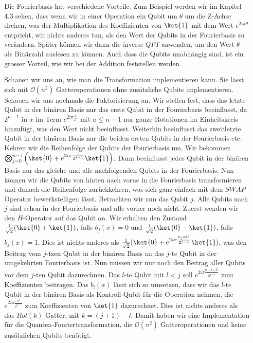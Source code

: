 
Die Fourierbasis hat verschiedene Vorteile. Zum Beispiel werden wir im Kapitel 4.3 sehen, dass wenn wir in einer Operation ein Qubit um $\theta$ um die Z-Achse drehen, was der Multiplikation des Koeffizienten von $\ket{1}$ mit dem Wert $e^{2i\pi\theta}$ entpricht, wir nichts anderes tun, als den Wert der Qubits in der Fourierbasis zu verändern. Später können wir dann die inverse $QFT$ anwenden, um den Wert $\theta$ als Binärzahl auslesen zu können. Auch dass die Qubits unabhängig sind, ist ein grosser Vorteil, wie wir bei der Addition feststellen werden.

Schauen wir uns an, wie man die Transformation implementieren kann. Sie lässt sich mit $\mathcal O(n^2)$ Gatteroperationen ohne zusätzliche Qubits implementieren. Schauen wir uns nochmals die Faktorisierung an. Wir stellen fest, dass das letzte Qubit in der binären Basis nur das erste Qubit in der Fourierbasis beeinflusst, da $2^{n - 1}$ in $x$ im Term $e^{2i\pi\frac{x}{2^a}}$ mit $a \leq n - 1$ nur ganze Rotationen im Einheitskreis hinzufügt, was den Wert nicht beeinflusst. Weiterhin beeinflusst das zweitletzte Qubit in der binären Basis nur die beiden ersten Qubits in der Fourierbasis etc. Kehren wir die Reihenfolge der Qubits der Fourierbasis um. Wir bekommen $\bigotimes_{j = 0}^{n - 1}\left(\ket{0} + e^{2i\pi\frac{x}{2^{j + 1}}}\ket{1}\right)$. Dann beeinflusst jedes Qubit in der binären Basis nur das gleiche und alle nachfolgenden Qubits in der Fourierbasis. Nun können wir die Qubits von hinten nach vorne in die Fourierbasis transformieren und danach die Reihenfolge zurückkehren, was sich ganz einfach mit dem $SWAP$-Operator bewerkstelligen lässt. Betrachten wir nun das Qubit $j$. Alle Qubits nach $j$ sind schon in der Fourierbasis und alle vorher noch nicht. Zuerst wenden wir den $H$-Operator auf das Qubit an. Wir erhalten den Zustand $\frac{1}{\sqrt{2}}(\ket{0} + \ket{1})$, falls $b_j(x) = 0$ und $\frac{1}{\sqrt{2}}(\ket{0} - \ket{1})$, falls $b_j(x) = 1$. Dies ist nichts anderes als $\frac{1}{\sqrt{2}}(\ket{0} + e^{2i\pi\frac{b_j{x}2^j}{2^{j + 1}}}\ket{1})$, was den Beitrag vom $j$-tzen Qubit in der binären Basis an das $j$-te Qubit in der umgekehrten Fourierbasis ist. Nun müssen wir nur noch den Beitrag aller Qubits vor dem $j$-ten Qubit dazurechnen. Das $l$-te Qubit mit $l < j$ soll $e^{2i\pi\frac{b_l(x)2^{l}}{2^{j + 1}}}$ zum Koeffizienten beitragen. Das $b_l(x)$ lässt sich so umsetzen, dass wir das $l$-te Qubit in der binären Basis als Kontroll-Qubit für die Operation nehmen, die $e^{2i\pi\frac{2^{l}}{2^{j + 1}}}$ zum Koeffizienten von $\ket{1}$ dazurechnet. Dies ist nichts anderes als das $Rot(k)$-Gatter, mit $k = (j + 1) - l$. Damit haben wir eine Implementation für die Quanten-Fouriertransformation, die $\mathcal O(n^2)$ Gatteroperationen und keine zusätzlichen Qubits benötigt.

